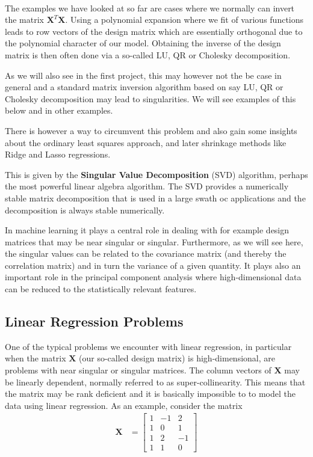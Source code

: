\documentclass[%
oneside,                 %
final,                   %
10pt]{article}
\begin{document}
\paragraph{}

The examples we have looked at so far are cases where we normally can
invert the matrix $\bm{X}^T\bm{X}$. Using a polynomial expansion where we fit of various functions leads to
row vectors of the design matrix which are essentially orthogonal due
to the polynomial character of our model. Obtaining the inverse of the
design matrix is then often done via a so-called LU, QR or Cholesky
decomposition.

As we will also see in the first project, 
this may
however not the be case in general and a standard matrix inversion
algorithm based on say LU, QR or Cholesky decomposition may lead to singularities. We will see examples of this below and in other examples.

There is however a way to circumvent this problem and also
gain some insights about the ordinary least squares approach, and
later shrinkage methods like Ridge and Lasso regressions.

This is given by the \textbf{Singular Value Decomposition} (SVD) algorithm,
perhaps the most powerful linear algebra algorithm.  The SVD provides
a numerically stable matrix decomposition that is used in a large
swath oc applications and the decomposition is always stable
numerically.

In machine learning it plays a central role in dealing with for
example design matrices that may be near singular or singular.
Furthermore, as we will see here, the singular values can be related
to the covariance matrix (and thereby the correlation matrix) and in
turn the variance of a given quantity. It plays also an important role
in the principal component analysis where high-dimensional data can be
reduced to the statistically relevant features.



\subsection*{Linear Regression Problems}

One of the typical problems we encounter with linear regression, in particular 
when the matrix $\bm{X}$ (our so-called design matrix) is high-dimensional, 
are problems with near singular or singular matrices. The column vectors of $\bm{X}$ 
may be linearly dependent, normally referred to as super-collinearity.  
This means that the matrix may be rank deficient and it is basically impossible to 
to model the data using linear regression. As an example, consider the matrix
\begin{align*}
\mathbf{X} & =  \left[
\begin{array}{rrr}
1 & -1 & 2
\\
1 & 0 & 1
\\
1 & 2  & -1
\\
1 & 1  & 0
\end{array} \right]
\end{align*}
\end{document}
